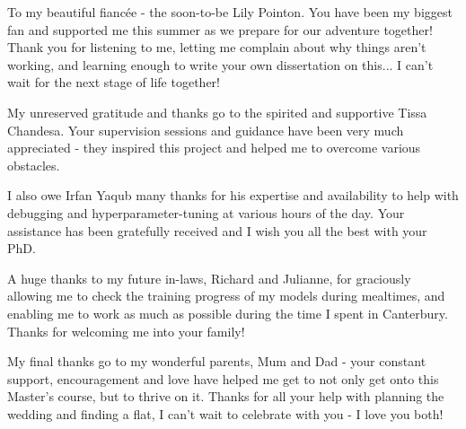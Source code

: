 \cleardoublepage


\begin{acknowledgements}

To my beautiful fiancée - the soon-to-be Lily Pointon. You have been my biggest fan and supported me this summer as we prepare for our adventure together! Thank you for listening to me, letting me complain about why things aren't working, and learning enough to write your own dissertation on this... I can't wait for the next stage of life together! 

My unreserved gratitude and thanks go to the spirited and supportive Tissa Chandesa. Your supervision sessions and guidance have been very much appreciated - they inspired this project and helped me to overcome various obstacles.

I also owe Irfan Yaqub many thanks for his expertise and availability to help with debugging and hyperparameter-tuning at various hours of the day. Your assistance has been gratefully received and I wish you all the best with your PhD.

A huge thanks to my future in-laws, Richard and Julianne, for graciously allowing me to check the training progress of my models during mealtimes, and enabling me to work as much as possible during the time I spent in Canterbury. Thanks for welcoming me into your family!

My final thanks go to my wonderful parents, Mum and Dad - your constant support, encouragement and love have helped me get to not only get onto this Master's course, but to thrive on it. Thanks for all your help with planning the wedding and finding a flat, I can't wait to celebrate with you - I love you both!

\end{acknowledgements}